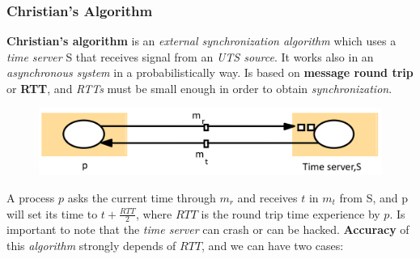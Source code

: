 \documentclass{article}
\begin{document}
\subsubsection{Christian's Algorithm}
\textbf{Christian's algorithm} is an \emph{external synchronization algorithm} which uses a \emph{time server} S that receives signal from an\emph{ UTS source}. It works also in an \emph{asynchronous system} in a probabilistically way. Is based on \textbf{message round trip} or \textbf{RTT}, and \emph{RTTs} must be small enough in order to obtain \emph{synchronization}. 
\begin{figure}[H]
  \centering
  \includegraphics[scale=0.5]{cattura12.png}
\end{figure}
\hfill \break
A process $p$ asks the current time through $m_r$ and receives $t$ in $m_t$ from S, and p will set its time to $t + \frac{RTT}{2}$, where $RTT$ is the round trip time experience by $p$. Is important to note that the \emph{time server} can crash or can be hacked. 
\clearpage 
\hfill \break
\textbf{Accuracy} of this \emph{algorithm} strongly depends of  $RTT$, and we can have two cases:\\
\end{document}

